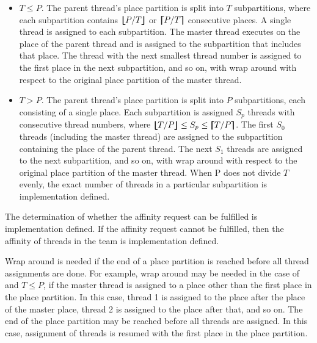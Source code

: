 \begin{itemize}
\item $T\leq P$. The parent thread's place partition is split into $T$ subpartitions, where each subpartition
contains $\bm{\lfloor\mkern-10mu\lfloor} P/T \bm{\rfloor\mkern-10mu\rfloor}$ or $\bm{\lceil\mkern-10mu\lceil} P/T \bm{\rceil\mkern-10mu\rceil}$ consecutive places. A single thread is assigned to each subpartition. The master thread executes on the place of the parent thread and is assigned to the subpartition that includes that place. The thread with the next smallest thread number is assigned to the first place in the next subpartition, and so on, with wrap around with respect to the original place partition of the master thread.

\item $T>P$. The parent thread's place partition is split into $P$ subpartitions, each consisting of a single place. Each subpartition is assigned $S_{p}$ threads with consecutive thread numbers, where $\blfloor T/P \brfloor \leq S_{p} \leq \blceil T/P \brceil$. The first $S_{0}$ threads (including the master thread) are assigned to the subpartition containing the place of the parent thread. The next $S_{1}$ threads are assigned to the next subpartition, and so on, with wrap around with respect to the original place partition of the master thread. When P does not divide $T$ evenly, the exact number of threads in a particular subpartition is implementation defined.
\end{itemize}

The determination of whether the affinity request can be fulfilled is implementation defined. If the affinity request cannot be fulfilled, then the affinity of threads in the team is implementation defined.

\begin{note}
Wrap around is needed if the end of a place partition is reached before all thread assignments are done. For example, wrap around may be needed in the case of  and $T\leq P$, if the master thread is assigned to a place other than the first place in the place partition. In this case, thread 1 is assigned to the place after the place of the master place, thread 2 is assigned to the place after that, and so on. The end of the place partition may be reached before all threads are assigned. In this case, assignment of threads is resumed with the first place in the place partition.
\end{note}

